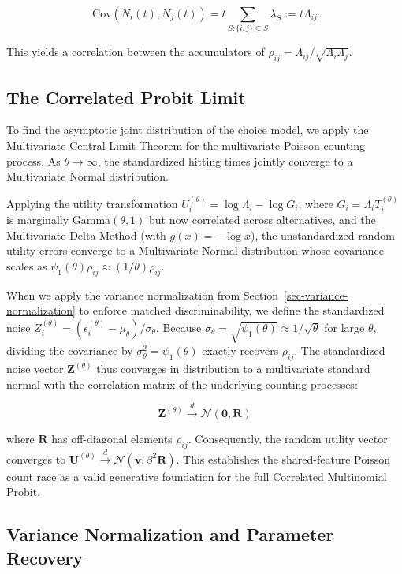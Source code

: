 \documentclass[
  man,
  floatsintext,
  longtable,
  a4paper,
  nolmodern,
  notxfonts,
  notimes,
  colorlinks=true,linkcolor=blue,citecolor=blue,urlcolor=blue]{apa7}
\begin{document}
\[\text{Cov}(N_i(t), N_j(t)) = t \sum_{S: \{i,j\} \subseteq S} \lambda_S := t \Lambda_{ij}\]

This yields a correlation between the accumulators of
\(\rho_{ij} = \Lambda_{ij} / \sqrt{\Lambda_i \Lambda_j}\).

\subsection{The Correlated Probit
Limit}\label{the-correlated-probit-limit}

To find the asymptotic joint distribution of the choice model, we apply
the Multivariate Central Limit Theorem for the multivariate Poisson
counting process. As \(\theta \to \infty\), the standardized hitting
times jointly converge to a Multivariate Normal distribution.

Applying the utility transformation
\(U_i^{(\theta)} = \log \Lambda_i - \log G_i\), where
\(G_i = \Lambda_i T_i^{(\theta)}\) is marginally
\(\text{Gamma}(\theta, 1)\) but now correlated across alternatives, and
the Multivariate Delta Method (with \(g(x) = -\log x\)), the
unstandardized random utility errors converge to a Multivariate Normal
distribution whose covariance scales as
\(\psi_1(\theta) \rho_{ij} \approx (1/\theta)\rho_{ij}\).

When we apply the variance normalization from
Section~\ref{sec-variance-normalization} to enforce matched
discriminability, we define the standardized noise
\(Z_i^{(\theta)} = (\epsilon_i^{(\theta)} - \mu_\theta) / \sigma_\theta\).
Because
\(\sigma_\theta = \sqrt{\psi_1(\theta)} \approx 1/\sqrt{\theta}\) for
large \(\theta\), dividing the covariance by
\(\sigma_\theta^2 = \psi_1(\theta)\) exactly recovers \(\rho_{ij}\). The
standardized noise vector \(\mathbf{Z}^{(\theta)}\) thus converges in
distribution to a multivariate standard normal with the correlation
matrix of the underlying counting processes:

\[\mathbf{Z}^{(\theta)} \xrightarrow{d} \mathcal{N}(\mathbf{0}, \mathbf{R})\]

where \(\mathbf{R}\) has off-diagonal elements \(\rho_{ij}\).
Consequently, the random utility vector converges to
\(\mathbf{U}^{(\theta)} \xrightarrow{d} \mathcal{N}(\mathbf{v}, \beta^2 \mathbf{R})\).
This establishes the shared-feature Poisson count race as a valid
generative foundation for the full Correlated Multinomial Probit.

\subsection{Variance Normalization and Parameter
Recovery}\label{variance-normalization-and-parameter-recovery}
\end{document}

